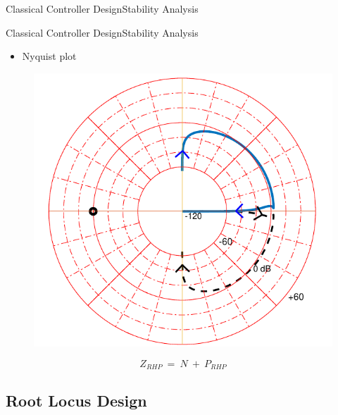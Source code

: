 \begin{frame}{Classical Controller Design}{Stability Analysis}
\begin{minipage}{\linewidth}
\begin{minipage}{0.45\linewidth}
\begin{figure}[H]
			\centering
		\end{figure}
	\end{minipage}
\end{minipage}
\end{frame}

\begin{frame}{Classical Controller Design}{Stability Analysis}	
\begin{itemize}
	\item Nyquist plot
\end{itemize}
\begin{figure}
	\includegraphics[scale=.45]{Pictures/nyquistCubli}
	\centering
\end{figure}	
\begin{displaymath}
\si{Z_{RHP}\ =\ N\ +\ P_{RHP}} \nonumber
\end{displaymath}
\end{frame}

\subsection{Root Locus Design}

